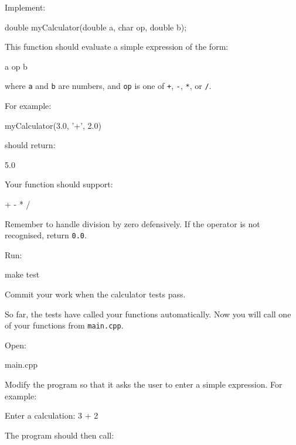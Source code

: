 \documentclass{csc2059practical}
\begin{document}
Implement:

\begin{cppcode}
double myCalculator(double a, char op, double b);
\end{cppcode}

This function should evaluate a simple expression of the form:

\begin{terminal}
a op b
\end{terminal}

where \texttt{a} and \texttt{b} are numbers, and \texttt{op} is one of \texttt{+}, \texttt{-}, \texttt{*}, or \texttt{/}.

For example:

\begin{cppcode}
myCalculator(3.0, '+', 2.0)
\end{cppcode}

should return:

\begin{terminal}
5.0
\end{terminal}

Your function should support:

\begin{terminal}
+
-
*
/
\end{terminal}

Remember to handle division by zero defensively. If the operator is not recognised, return \texttt{0.0}.

Run:

\begin{bashcode}
make test
\end{bashcode}

Commit your work when the calculator tests pass.


So far, the tests have called your functions automatically. Now you will call one of your functions from \texttt{main.cpp}.

Open:

\begin{terminal}
main.cpp
\end{terminal}

Modify the program so that it asks the user to enter a simple expression. For example:

\begin{terminal}
Enter a calculation: 3 + 2
\end{terminal}

The program should then call:
\end{document}
